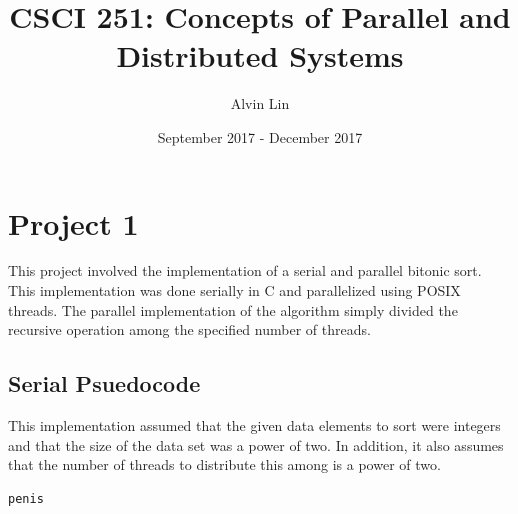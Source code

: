 \documentclass{math}
\title{CSCI 251: Concepts of Parallel and Distributed Systems}
\author{Alvin Lin}
\date{September 2017 - December 2017}
\begin{document}
\maketitle

\section*{Project 1}
This project involved the implementation of a serial and parallel bitonic sort.
This implementation was done serially in C and parallelized using POSIX threads.
The parallel implementation of the algorithm simply divided the recursive
operation among the specified number of threads.

\subsection*{Serial Psuedocode}
This implementation assumed that the given data elements to sort were integers
and that the size of the data set was a power of two. In addition, it also
assumes that the number of threads to distribute this among is a power of two.
\begin{lstlisting}
penis
\end{lstlisting}
\end{document}
